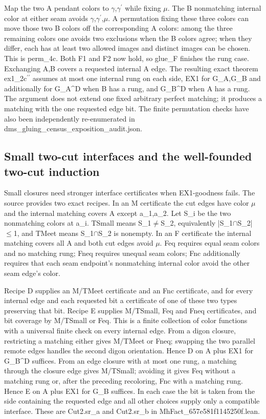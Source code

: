 \documentclass[11pt,a4paper]{article}
\begin{document}
Map the two A pendant colors to \ensuremath{\gamma},\ensuremath{\gamma}\ensuremath{^{\prime}} while fixing \ensuremath{\mu}. The B nonmatching internal color at either seam avoids \ensuremath{\gamma},\ensuremath{\gamma}\ensuremath{^{\prime}},\ensuremath{\mu}. A permutation fixing these three colors can move those two B colors off the corresponding A colors: among the three remaining colors one avoids two exclusions when the B colors agree; when they differ, each has at least two allowed images and distinct images can be chosen. This is perm\_4c. Both F1 and F2 now hold, so glue\_F finishes the rung case. Exchanging A,B covers a requested internal A edge. The resulting exact theorem ex1\_2c\ensuremath{^{\prime\prime}} assumes at most one internal rung on each side, EX1 for G\_A,G\_B and additionally for G\_A\textasciicircum{}D when B has a rung, and G\_B\textasciicircum{}D when A has a rung. The argument does not extend one fixed arbitrary perfect matching; it produces a matching with the one requested edge bit. The finite permutation checks have also been independently re-enumerated in dms\_gluing\_census\_exposition\_audit.json.

\subsection{Small two-cut interfaces and the well-founded two-cut induction}
Small closures need stronger interface certificates when EX1-goodness fails. The source provides two exact recipes. In an M certificate the cut edges have color \ensuremath{\mu} and the internal matching covers A except a\_1,a\_2. Let S\_i be the two nonmatching colors at a\_i. TSmall means S\_1\ensuremath{\neq}S\_2, equivalently |S\_1\ensuremath{\cap}S\_2|\ensuremath{\leq}1, and TMeet means S\_1\ensuremath{\cap}S\_2 is nonempty. In an F certificate the internal matching covers all A and both cut edges avoid \ensuremath{\mu}. Feq requires equal seam colors and no matching rung; Fneq requires unequal seam colors; Fnc additionally requires that each seam endpoint's nonmatching internal color avoid the other seam edge's color.

Recipe D supplies an M/TMeet certificate and an Fnc certificate, and for every internal edge and each requested bit a certificate of one of these two types preserving that bit. Recipe E supplies M/TSmall, Feq and Fneq certificates, and bit coverage by M/TSmall or Feq. This is a finite collection of color functions with a universal finite check on every internal edge. From a digon closure, restricting a matching either gives M/TMeet or Fneq; swapping the two parallel remote edges handles the second digon orientation. Hence D on A plus EX1 for G\_B\textasciicircum{}D suffices. From an edge closure with at most one rung, a matching through the closure edge gives M/TSmall; avoiding it gives Feq without a matching rung or, after the preceding recoloring, Fnc with a matching rung. Hence E on A plus EX1 for G\_B suffices. In each case the bit is taken from the side containing the requested edge and all other choices supply only a compatible interface. These are Cut2.sr\_a and Cut2.sr\_b in MhFact\_657e581f1145250f.lean.
\end{document}
